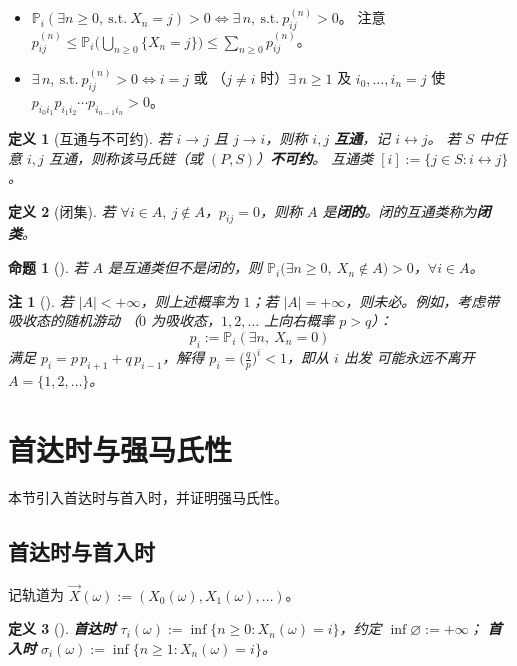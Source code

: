 \documentclass[lang=cn,10pt,newtx,thmcnt=chapter,mode=simple]{vividbook}
\providecommand{\Pp}{}\renewcommand{\Pp}{\mathbb{P}}
\newcommand{\reach}{\to}
\newcommand{\comm}{\leftrightarrow}
\theoremstyle{vividthm}
\newtheorem*{vividproposition}{命题}
\theoremstyle{vividdef}
\newtheorem*{vividdefinition}{定义}
\theoremstyle{vividexa}
\theoremstyle{vividrem}
\newtheorem*{vividremark}{注}
\renewenvironment{proposition}[1][]{\begin{vividproposition}[#1]}{\end{vividproposition}}
\renewenvironment{definition}[1][]{\begin{vividdefinition}[#1]}{\end{vividdefinition}}
\renewenvironment{remark}[1][]{\begin{vividremark}[#1]}{\end{vividremark}}
\begin{document}
\begin{itemize}
  \item $\Pp_i(\exists n\ge0,\ \text{s.t.}\ X_n=j)>0\iff \exists\,n,\ \text{s.t.}\ p_{ij}^{(n)}>0$。
        注意 $p_{ij}^{(n)}\le\Pp_i\bigl(\bigcup_{n\ge0}\{X_n=j\}\bigr)\le\sum_{n\ge0}p_{ij}^{(n)}$。
  \item $\exists\,n,\ \text{s.t.}\ p_{ij}^{(n)}>0\iff i=j$ 或
        （$j\ne i$ 时）$\exists\,n\ge1$ 及 $i_0,\dots,i_n=j$ 使
        $p_{i_0i_1}p_{i_1i_2}\cdots p_{i_{n-1}i_n}>0$。
\end{itemize}

\begin{definition}[互通与不可约]
若 $i\reach j$ 且 $j\reach i$，则称 $i,j$ \textbf{互通}，记 $i\comm j$。
若 $S$ 中任意 $i,j$ 互通，则称该马氏链（或 $(P,S)$）\textbf{不可约}。
互通类 $[i]:=\{j\in S:i\comm j\}$。
\end{definition}

\begin{definition}[闭集]
若 $\forall i\in A,\ j\notin A$，$p_{ij}=0$，则称 $A$ 是\textbf{闭的}。闭的互通类称为\textbf{闭类}。
\end{definition}

\begin{proposition}
若 $A$ 是互通类但不是闭的，则
$\Pp_i\bigl(\exists n\ge0,\ X_n\notin A\bigr)>0$，$\forall i\in A$。
\end{proposition}

\begin{remark}
若 $|A|<+\infty$，则上述概率为 $1$；若 $|A|=+\infty$，则未必。例如，考虑带吸收态的随机游动
（$0$ 为吸收态，$1,2,\dots$ 上向右概率 $p>q$）：
\[
p_i:=\Pp_i(\exists n,\ X_n=0)
\]
满足 $p_i=p\,p_{i+1}+q\,p_{i-1}$，解得 $p_i=\bigl(\tfrac{q}{p}\bigr)^i<1$，即从 $i$ 出发
可能永远不离开 $A=\{1,2,\dots\}$。
\end{remark}

\section{首达时与强马氏性}

本节引入首达时与首入时，并证明强马氏性。

\subsection{首达时与首入时}

记轨道为 $\vec{X}(\omega):=(X_0(\omega),X_1(\omega),\dots)$。

\begin{definition}
\textbf{首达时} $\tau_i(\omega):=\inf\{n\ge0:X_n(\omega)=i\}$，约定 $\inf\varnothing:=+\infty$；
\textbf{首入时} $\sigma_i(\omega):=\inf\{n\ge1:X_n(\omega)=i\}$。
\end{definition}
\end{document}
